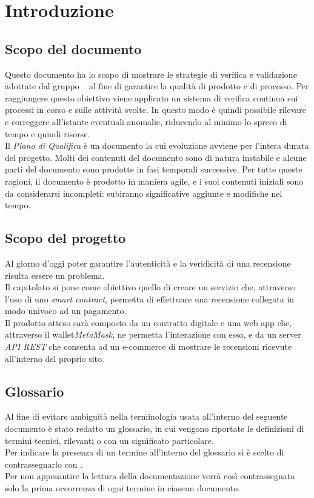 \section{Introduzione}

\subsection{Scopo del documento}
Questo documento ha lo scopo di mostrare le strategie di verifica e validazione adottate dal gruppo \groupName ~ al fine di garantire la qualità di prodotto e di processo. Per raggiungere questo obiettivo viene applicato un sistema di verifica continua sui processi in corso e sulle attività svolte. In questo modo è quindi possibile rilevare e correggere all'istante eventuali anomalie, riducendo al minimo lo spreco di tempo e quindi risorse.\\
Il \textit{Piano di Qualifica} è un documento la cui evoluzione avviene per l'intera durata del progetto. Molti dei contenuti del documento sono di natura instabile e alcune parti del documento sono prodotte in fasi temporali successive. Per tutte queste ragioni, il documento è prodotto in maniera agile, e i suoi contenuti iniziali sono da considerarsi incompleti: subiranno significative aggiunte e modifiche nel tempo.

\subsection{Scopo del progetto}

Al giorno d'oggi poter garantire l'autenticità e la veridicità di una
recensione\glo \: risulta essere un problema. \\ Il capitolato \capName si
pone come obiettivo quello di creare un servizio che, attraverso l'uso di uno
\textit{smart contract}\glo \:, permetta di effettuare una recensione collegata in
modo univoco ad un pagamento. \\ Il prodotto atteso sarà composto da un
contratto digitale e una web app che, attraverso il wallet\glo  \textit{MetaMask}\glo \:, ne
permetta l'interazione con esso, e da un server \textit{API REST}\glo \: che consenta ad un
e-commerce\glo \: di mostrare le recensioni ricevute all'interno del proprio sito.

\subsection{Glossario}
Al fine di evitare ambiguità nella terminologia usata all'interno del seguente
documento è stato redatto un glossario, in cui vengono riportate le definizioni
di termini tecnici, rilevanti o con un significato particolare. \\ Per indicare
la presenza di un termine all'interno del glossario si è scelto di
contrassegnarlo con \glo .\\ Per non appesantire la lettura della documentazione
verrà così contrassegnata solo la prima occorrenza di ogni termine in ciascun
documento.

